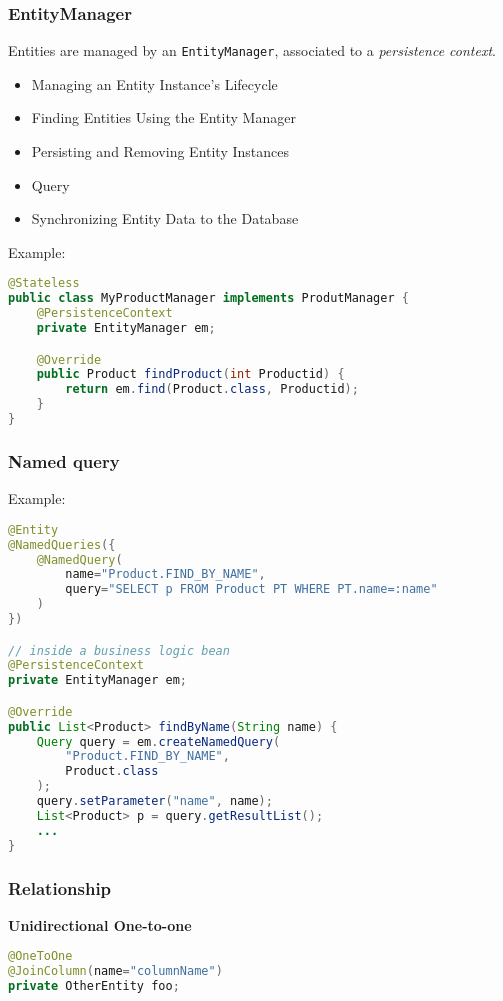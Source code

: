 \subsubsection{EntityManager}
Entities are managed by an \lstinline{EntityManager}, associated to a \emph{persistence context}.
\begin{itemize}
    \item Managing an Entity Instance’s Lifecycle
    \item Finding Entities Using the Entity Manager
    \item Persisting and Removing Entity Instances
    \item Query
    \item Synchronizing Entity Data to the Database
\end{itemize}

Example:
\begin{lstlisting}[language=Java]
@Stateless
public class MyProductManager implements ProdutManager {
    @PersistenceContext
    private EntityManager em;

    @Override
    public Product findProduct(int Productid) {
        return em.find(Product.class, Productid);
    }
}
\end{lstlisting}

\subsubsection{Named query}
Example:
\begin{lstlisting}[language=Java]
@Entity
@NamedQueries({
    @NamedQuery(
        name="Product.FIND_BY_NAME",
        query="SELECT p FROM Product PT WHERE PT.name=:name"
    )
})

// inside a business logic bean
@PersistenceContext
private EntityManager em;

@Override
public List<Product> findByName(String name) {
    Query query = em.createNamedQuery(
        "Product.FIND_BY_NAME",
        Product.class
    );
    query.setParameter("name", name);
    List<Product> p = query.getResultList();
    ...
}
\end{lstlisting}

\subsubsection{Relationship}
\textbf{Unidirectional One-to-one}\\
\begin{lstlisting}[language=Java]
@OneToOne
@JoinColumn(name="columnName")
private OtherEntity foo;
\end{lstlisting}

